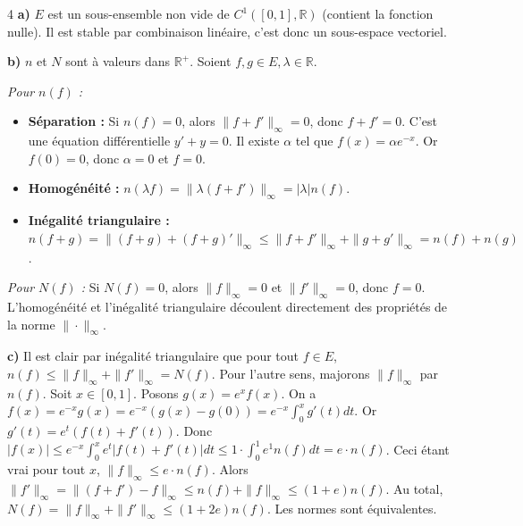 \begin{correction}{4}
\textbf{a)} $E$ est un sous-ensemble non vide de $C^1([0,1], \mathbb{R})$ (contient la fonction nulle). Il est stable par combinaison linéaire, c'est donc un sous-espace vectoriel.

\textbf{b)} $n$ et $N$ sont à valeurs dans $\mathbb{R}^+$. Soient $f,g \in E, \lambda \in \mathbb{R}$.

\textit{Pour $n(f)$ :}
\begin{itemize}
    \item \textbf{Séparation :} Si $n(f)=0$, alors $\|f+f'\|_\infty = 0$, donc $f+f'=0$. C'est une équation différentielle $y' + y = 0$. Il existe $\alpha$ tel que $f(x) = \alpha e^{-x}$. Or $f(0)=0$, donc $\alpha=0$ et $f=0$.
    \item \textbf{Homogénéité :} $n(\lambda f) = \|\lambda(f+f')\|_\infty = |\lambda| n(f)$.
    \item \textbf{Inégalité triangulaire :} $n(f+g) = \|(f+g) + (f+g)'\|_\infty \le \|f+f'\|_\infty + \|g+g'\|_\infty = n(f) + n(g)$.
\end{itemize}

\textit{Pour $N(f)$ :}
Si $N(f)=0$, alors $\|f\|_\infty = 0$ et $\|f'\|_\infty = 0$, donc $f=0$. L'homogénéité et l'inégalité triangulaire découlent directement des propriétés de la norme $\|\cdot\|_\infty$.

\textbf{c)} Il est clair par inégalité triangulaire que pour tout $f \in E$, $n(f) \le \|f\|_\infty + \|f'\|_\infty = N(f)$.
Pour l'autre sens, majorons $\|f\|_\infty$ par $n(f)$.
Soit $x \in [0,1]$. Posons $g(x) = e^x f(x)$. On a $f(x) = e^{-x} g(x) = e^{-x} (g(x)-g(0)) = e^{-x} \int_0^x g'(t) dt$.
Or $g'(t) = e^t (f(t)+f'(t))$. Donc $|f(x)| \le e^{-x} \int_0^x e^t |f(t)+f'(t)| dt \le 1 \cdot \int_0^1 e^1 n(f) dt = e \cdot n(f)$.
Ceci étant vrai pour tout $x$, $\|f\|_\infty \le e \cdot n(f)$.
Alors $\|f'\|_\infty = \|(f+f') - f\|_\infty \le n(f) + \|f\|_\infty \le (1+e)n(f)$.
Au total, $N(f) = \|f\|_\infty + \|f'\|_\infty \le (1+2e) n(f)$. Les normes sont équivalentes.
\end{correction}

